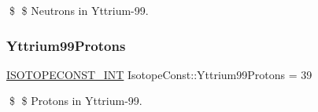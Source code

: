 \$ \$ Neutrons in Yttrium-\/99. \mbox{\label{group___isotope_const-_yttrium-_y99_gaf5db05f09ac489392ff6f848de5badaa}} 
\subsubsection{\texorpdfstring{Yttrium99\+Protons}{Yttrium99Protons}}
{\footnotesize\ttfamily \mbox{\hyperlink{group___isotope_const-_macros_ga5f18360b3e99483a35c32d789e62621c}{I\+S\+O\+T\+O\+P\+E\+C\+O\+N\+S\+T\+\_\+\+I\+NT}} Isotope\+Const\+::\+Yttrium99\+Protons = 39}

\$ \$ Protons in Yttrium-\/99. 
